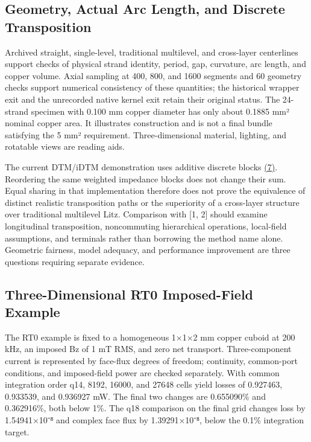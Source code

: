 \documentclass[journal,10pt]{IEEEtran}
\begin{document}
\subsection*{Geometry, Actual Arc Length, and Discrete Transposition}
\hypertarget{S2.geometry.heading}{}
Archived straight, single-level, traditional multilevel, and cross-layer centerlines support checks of physical strand identity, period, gap, curvature, arc length, and copper volume. Axial sampling at 400, 800, and 1600 segments and 60 geometry checks support numerical consistency of these quantities; the historical wrapper exit and the unrecorded native kernel exit retain their original status. The 24-strand specimen with 0.100 mm copper diameter has only about 0.1885 mm² nominal copper area. It illustrates construction and is not a final bundle satisfying the 5 mm² requirement. Three-dimensional material, lighting, and rotatable views are reading aids.


The current DTM/iDTM demonstration uses additive discrete blocks \href{paper_en_ieee.pdf#E06}{(7)}. Reordering the same weighted impedance blocks does not change their sum. Equal sharing in that implementation therefore does not prove the equivalence of distinct realistic transposition paths or the superiority of a cross-layer structure over traditional multilevel Litz. Comparison with [1, 2] should examine longitudinal transposition, noncommuting hierarchical operations, local-field assumptions, and terminals rather than borrowing the method name alone. Geometric fairness, model adequacy, and performance improvement are three questions requiring separate evidence.


\subsection*{Three-Dimensional RT0 Imposed-Field Example}
\hypertarget{S2.rt0.heading}{}
The RT0 example is fixed to a homogeneous 1×1×2 mm copper cuboid at 200 kHz, an imposed Bz of 1 mT RMS, and zero net transport. Three-component current is represented by face-flux degrees of freedom; continuity, common-port conditions, and imposed-field power are checked separately. With common integration order q14, 8192, 16000, and 27648 cells yield losses of 0.927463, 0.933539, and 0.936927 mW. The final two changes are 0.655090\% and 0.362916\%, both below 1\%. The q18 comparison on the final grid changes loss by 1.54941×10⁻⁸ and complex face flux by 1.39291×10⁻⁸, below the 0.1\% integration target.
\end{document}
